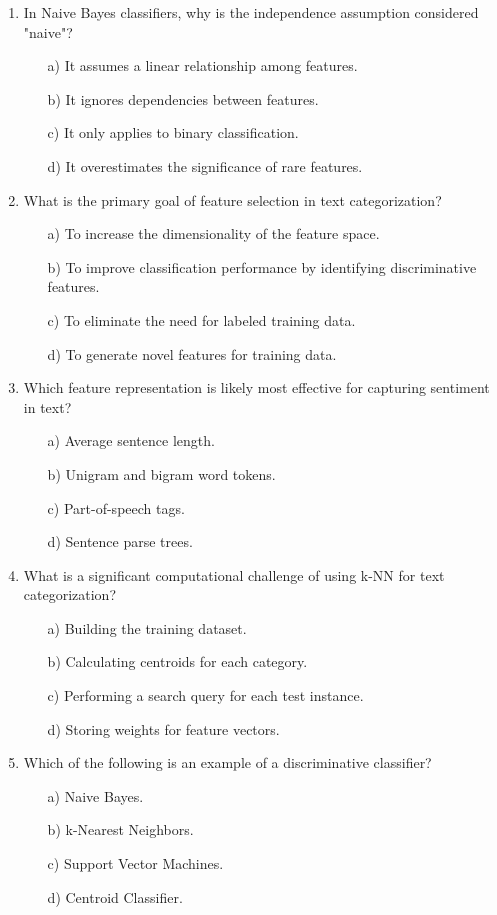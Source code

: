 \documentclass[8pt]{extarticle}
\begin{document}
\begin{multicols}{2}
\begin{enumerate}
\item In Naive Bayes classifiers, why is the independence assumption considered "naive"?
\begin{itemize}
\item[a)] It assumes a linear relationship among features.
\item[b)] It ignores dependencies between features.
\item[c)] It only applies to binary classification.
\item[d)] It overestimates the significance of rare features.
\end{itemize}


\item What is the primary goal of feature selection in text categorization?
\begin{itemize}
\item[a)] To increase the dimensionality of the feature space.
\item[b)] To improve classification performance by identifying discriminative features.
\item[c)] To eliminate the need for labeled training data.
\item[d)] To generate novel features for training data.
\end{itemize}


\item Which feature representation is likely most effective for capturing sentiment in text?
\begin{itemize}
\item[a)] Average sentence length.
\item[b)] Unigram and bigram word tokens.
\item[c)] Part-of-speech tags.
\item[d)] Sentence parse trees.
\end{itemize}


\item What is a significant computational challenge of using k-NN for text categorization?
\begin{itemize}
\item[a)] Building the training dataset.
\item[b)] Calculating centroids for each category.
\item[c)] Performing a search query for each test instance.
\item[d)] Storing weights for feature vectors.
\end{itemize}


\item Which of the following is an example of a discriminative classifier?
\begin{itemize}
\item[a)] Naive Bayes.
\item[b)] k-Nearest Neighbors.
\item[c)] Support Vector Machines.
\item[d)] Centroid Classifier.
\end{itemize}



\end{enumerate}
\end{multicols}
\end{document}
